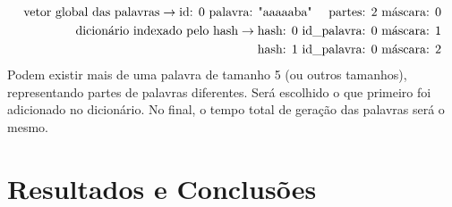 \documentclass[a4paper]{article}
\begin{document}
\begin{eqnarray*}
	\textrm{vetor global das palavras} \rightarrow \textrm{id: 0 palavra: "aaaaaba" \quad partes: 2 máscara: 0}\\
	\textrm{dicionário indexado pelo hash} \rightarrow \textrm{hash: 0 id\_palavra: 0 máscara: 1}\\
					 \textrm{hash: 1 id\_palavra: 0 máscara: 2}\\
\end{eqnarray*}	
\indent Podem existir mais de uma palavra de tamanho 5 (ou outros tamanhos), representando partes de palavras diferentes. Será escolhido o que primeiro foi adicionado no dicionário. No final, o tempo total de geração das palavras será o mesmo.
	
\section{Resultados e Conclusões}

\begin{thebibliography}{99}
	
\end{thebibliography}
\end{document}

